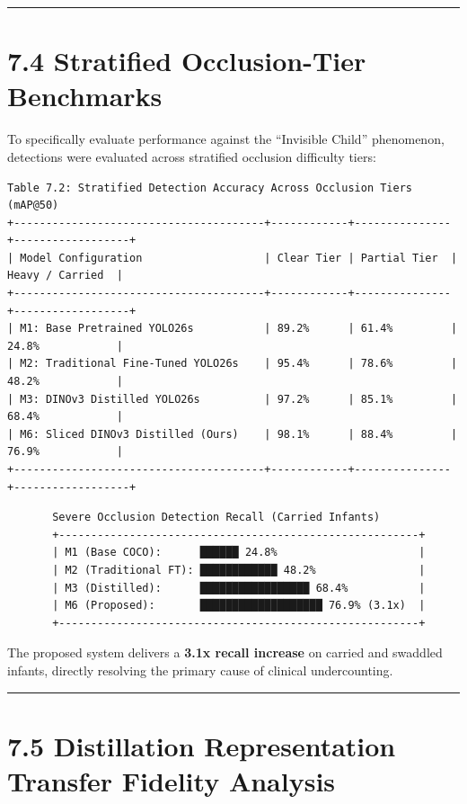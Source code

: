 \begin{center}\rule{0.5\linewidth}{0.5pt}\end{center}

\section{7.4 Stratified Occlusion-Tier
Benchmarks}\label{stratified-occlusion-tier-benchmarks}

To specifically evaluate performance against the ``Invisible Child''
phenomenon, detections were evaluated across stratified occlusion
difficulty tiers:

\begin{verbatim}
Table 7.2: Stratified Detection Accuracy Across Occlusion Tiers (mAP@50)
+---------------------------------------+------------+---------------+------------------+
| Model Configuration                   | Clear Tier | Partial Tier  | Heavy / Carried  |
+---------------------------------------+------------+---------------+------------------+
| M1: Base Pretrained YOLO26s           | 89.2%      | 61.4%         | 24.8%            |
| M2: Traditional Fine-Tuned YOLO26s    | 95.4%      | 78.6%         | 48.2%            |
| M3: DINOv3 Distilled YOLO26s          | 97.2%      | 85.1%         | 68.4%            |
| M6: Sliced DINOv3 Distilled (Ours)    | 98.1%      | 88.4%         | 76.9%            |
+---------------------------------------+------------+---------------+------------------+
\end{verbatim}

\begin{verbatim}
       Severe Occlusion Detection Recall (Carried Infants)
       +--------------------------------------------------------+
       | M1 (Base COCO):      ██████ 24.8%                      |
       | M2 (Traditional FT): ████████████ 48.2%                |
       | M3 (Distilled):      █████████████████ 68.4%           |
       | M6 (Proposed):       ███████████████████ 76.9% (3.1x)  |
       +--------------------------------------------------------+
\end{verbatim}

The proposed system delivers a \textbf{3.1x recall increase} on carried
and swaddled infants, directly resolving the primary cause of clinical
undercounting.

\begin{center}\rule{0.5\linewidth}{0.5pt}\end{center}

\section{7.5 Distillation Representation Transfer Fidelity
Analysis}\label{distillation-representation-transfer-fidelity-analysis}

